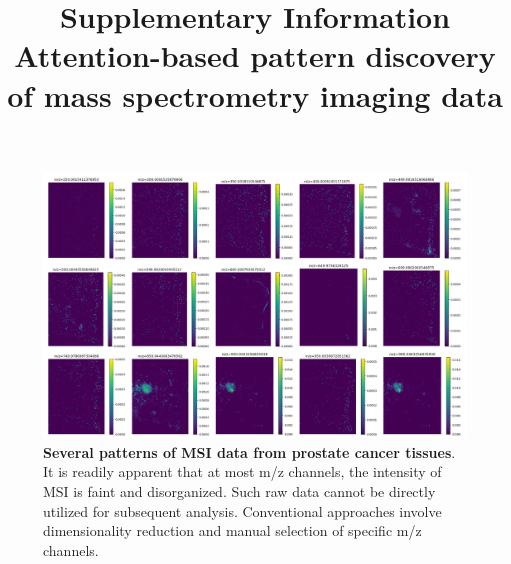 \documentclass{WileyMSP-template}
\begin{document}
\title{Supplementary Information \\Attention-based pattern discovery of mass spectrometry imaging data}
\maketitle
\begin{figure}[htbp]
  \centering
  \includegraphics[width=\linewidth]{pic/prostate/several_mz.png}
  \captionsetup{justification=raggedright,singlelinecheck=false}
  \caption 
  {
    \textbf{Several patterns of MSI data from prostate cancer tissues}.
    It is readily apparent that at most m/z channels, the intensity of MSI 
    is faint and disorganized. Such raw data cannot be directly utilized 
    for subsequent analysis. 
    Conventional approaches involve dimensionality reduction and manual 
    selection of specific m/z channels. 
  }
  \label{fig:Several patterns of prostate tissue} 
\end{figure}
\end{document}

